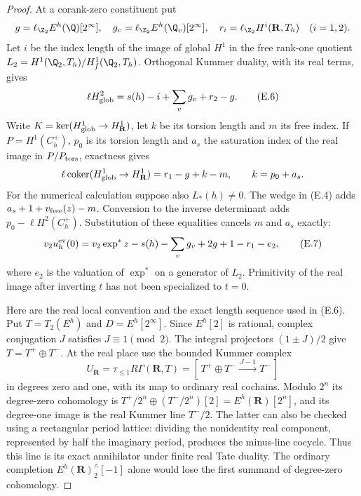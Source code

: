 \begin{proof}\leavevmode
At a corank-zero constituent put
\[
 g=\ell_{\Z_2}E^h(\Q)[2^\infty],\quad
 g_v=\ell_{\Z_2}E^h(\Q_v)[2^\infty],\quad
 r_i=\ell_{\Z_2}H^i(\mathbf R,T_h)\quad(i=1,2).
\]
Let $i$ be the index length of the image of global $H^1$ in the
free rank-one quotient $L_2=H^1(\Q_2,T_h)/H_f^1(\Q_2,T_h)$.
Orthogonal Kummer duality, with its real terms, gives
\[
 \ell H^2_{\rm glob}=s(h)-i+\sum_v g_v+r_2-g.                     \tag{E.6}
\]
Write $K=\ker(H^1_{\rm glob}\to H^1_{\mathbf R})$, let $k$ be its
torsion length and $m$ its free index. If $P=H^1(C_h^+)$, $p_0$ is
its torsion length and $a_s$ the saturation index of the real image
in $P/P_{\rm tors}$, exactness gives
\[
 \ell\operatorname{coker}(H^1_{\rm glob}\to H^1_{\mathbf R})
       =r_1-g+k-m,\qquad k=p_0+a_s.
\]
For the numerical calculation suppose also $L_*(h)\ne0$.
The wedge in (E.4) adds $a_s+1+v_{\rm free}(z)-m$.
Conversion to the inverse determinant adds $p_0-\ell H^2(C_h^+)$.
Substitution of these equalities cancels $m$ and $a_s$ exactly:
\[
 v_2u_h^{\rm ev}(0)
 =v_2\exp^*z-s(h)-\sum_v g_v+2g+1-r_1-e_2,                      \tag{E.7}
\]
where $e_2$ is the valuation of $\exp^*$ on a generator of $L_2$.
Primitivity of the real image after inverting $t$ has not been
specialized to $t=0$.

Here are the real local convention and the exact length sequence used
in (E.6). Put $T=T_2(E^h)$ and $D=E^h[2^\infty]$. Since $E^h[2]$ is
rational, complex conjugation $J$ satisfies $J\equiv1\pmod2$.
The integral projectors $(1\pm J)/2$ give $T=T^+\oplus T^-$.
At the real place use the bounded Kummer complex
\[
 U_{\mathbf R}=\tau_{\le1}R\Gamma(\mathbf R,T)
   =[\,T^+\oplus T^-\xrightarrow{\,J-1\,}T^-\,]
\]
in degrees zero and one, with its map to ordinary real cochains.
Modulo $2^n$ its degree-zero cohomology is
$T^+/2^n\oplus(T^-/2^n)[2]=E^h(\mathbf R)[2^n]$, and its degree-one
image is the real Kummer line $T^-/2$. The latter can also be checked
using a rectangular period lattice: dividing the nonidentity real
component, represented by half the imaginary period, produces the
minus-line cocycle. Thus this line is its exact annihilator under
finite real Tate duality. The ordinary completion
$E^h(\mathbf R)^\wedge_2[-1]$ alone would lose the first summand of
degree-zero cohomology.


\end{proof}
